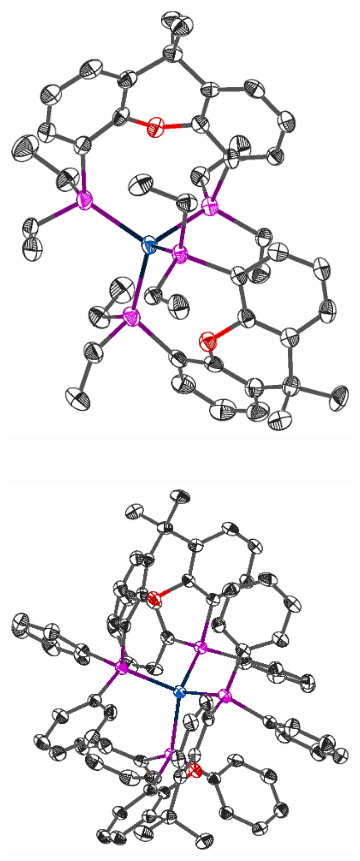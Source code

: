 \begin{figure}[htbp]
\centering
\begin{subfigure}[b]{0.45\textwidth}
	\centering
	\includegraphics[scale=0.6]{../Othercrystals/Etxantphos.eps}
	\caption{}
	\label{Etxantphos}
\end{subfigure}
~
\begin{subfigure}[b]{0.45\textwidth}
	\centering
	\includegraphics[scale=0.72]{../Othercrystals/628252.eps}

\end{subfigure}
\end{figure}
